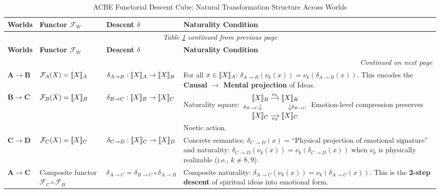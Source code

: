 \renewcommand{\arraystretch}{1.32}
\small
\begin{longtable}{p{1.2cm}|p{2.2cm}|p{2.8cm}|p{6cm}}
\caption{ACBE Functorial Descent Cube: Natural Transformation Structure Across Worlds}
\label{tab:ACBE-descent-cube} \\
\toprule
\textbf{Worlds}
& \textbf{Functor $\mathcal{F}_W$}
& \textbf{Descent $\delta$}
& \textbf{Naturality Condition}
\\
\midrule
\endfirsthead
\multicolumn{4}{c}{\textit{Table \ref{tab:ACBE-descent-cube} continued from previous page}} \\
\toprule
\textbf{Worlds}
& \textbf{Functor $\mathcal{F}_W$}
& \textbf{Descent $\delta$}
& \textbf{Naturality Condition}
\\
\midrule
\endhead
\midrule
\multicolumn{4}{r}{\textit{Continued on next page}} \\
\endfoot
\bottomrule
\endlastfoot

$\mathbf{A \to B}$
& $\mathcal{F}_A(X) = \llbracket X \rrbracket_A$
& $\delta_{A\to B} : \llbracket X \rrbracket_A \to \llbracket X \rrbracket_B$
& For all $x \in \llbracket X \rrbracket_A$:
$\delta_{A\to B}(\nu_k(x)) = \nu_k( \delta_{A\to B}(x) )$.
This encodes the \textbf{Causal $\to$ Mental projection} of Ideas.
\\
\midrule

$\mathbf{B \to C}$
& $\mathcal{F}_B(X) = \llbracket X \rrbracket_B$
& $\delta_{B\to C} : \llbracket X \rrbracket_B \to \llbracket X \rrbracket_C$
& Naturality square:
$\begin{tikzcd}[cramped,sep=small]
\sem{X}_B \arrow[r,"\nu_k"] \arrow[d,"\delta_{B\to C}"']
& \sem{X}_B \arrow[d,"\delta_{B\to C}"] \\
\sem{X}_C \arrow[r,"\nu_k"']
& \sem{X}_C
\end{tikzcd}$
Emotion-level compression preserves Noetic action.
\\
\midrule

$\mathbf{C \to D}$
& $\mathcal{F}_C(X) = \llbracket X \rrbracket_C$
& $\delta_{C\to D} : \llbracket X \rrbracket_C \to \llbracket X \rrbracket_D$
& Concrete semantics:
$\delta_{C\to D}(x) = \text{``Physical projection of emotional signature''}$
and naturality:
$\delta_{C\to D}(\nu_k(x)) = \nu_k(\delta_{C\to D}(x))$
when $\nu_k$ is physically realizable (i.e., $k \neq 8,9$).
\\
\midrule

$\mathbf{A \to C}$
& Composite functor $\mathcal{F}_C \circ \mathcal{F}_B$
& $\delta_{A\to C} = \delta_{B\to C} \circ \delta_{A\to B}$
& Composite naturality:
$\delta_{A\to C}(\nu_k(x)) = \nu_k(\delta_{A\to C}(x))$.
This is the \textbf{2-step descent} of spiritual ideas into emotional form.
\\
\midrule


\end{longtable}

